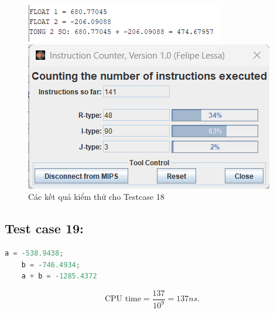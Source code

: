 \begin{figure}[!h]
    \centering
    \begin{minipage}[b]{0.48\textwidth}
        \centering
        \includegraphics[width=\textwidth]{image/TESTCASE/Testcase 18.png}
    \end{minipage}
    \hfill
    \begin{minipage}[b]{0.48\textwidth}
        \centering
        \includegraphics[width=\textwidth]{image/TESTCASE/Instruction Counter 18.png}
    \end{minipage}
    \vspace{0.5cm}
    \caption{Các kết quả kiểm thử cho Testcase 18}
\end{figure}

\vspace{0.5cm}

\subsection{Test case 19:}
\begin{lstlisting}[language=Python]
    a = -538.9438;
    b = -746.4934;
    a + b = -1285.4372
\end{lstlisting}
\[
\text{CPU time} = \frac{\text{137}}{10^9} = 137  ns.
\]

